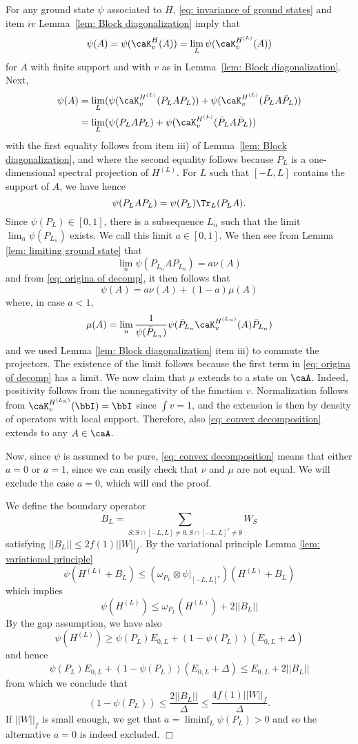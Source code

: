 For any ground state $\psi$ associated to $H$, \eqref{eq: invariance of ground states} and item $iv$ Lemma~\ref{lem: Block diagonalization} imply that
$$
\psi(A)=  \psi(\caK_v^H(A)) = \lim_L \psi(\caK_v^{H^{(L)}}(A))
$$
for $A$ with finite support and
with  $v$ as in Lemma~\ref{lem: Block diagonalization}.
Next,
\begin{align}
\psi(A) &=  \lim_L ( \psi(\caK_v^{H^{(L)}}(P_LAP_L)) +  \psi(\caK_v^{H^{(L)}}(\bar P_L A\bar P_L)) 
\\
&=  \lim_L ( \psi(P_LAP_L) +  \psi(\caK_v^{H^{(L)}}(\bar P_L A\bar P_L))  \label{eq: origina of decomp}
\end{align}
with the first equality follows from item iii) of Lemma~\ref{lem: Block diagonalization}, and
where the second equality follows because $P_L$ is a one-dimensional spectral projection of $H^{(L)}$. 
For $L$ such that $[-L,L]$ contains the support of $A$, we have hence
$$
\psi(P_LAP_L)= \psi(P_L) \Tr_L(P_LA).
$$
Since $\psi(P_L) \in [0,1]$, there is a subsequence $L_n$ such that the limit $\lim_n\psi(P_{L_n})$ exists. We call this limit $a \in [0,1]$.
We then see from Lemma \ref{lem: limiting ground state} that
$$
\lim_n \psi(P_{L_n}AP_{L_n}) = a \nu(A)
$$
and from \eqref{eq: origina of decomp}, it then follows that 
\begin{equation}\label{eq: convex decomposition}
\psi(A)= a \nu(A) +(1-a)\mu(A)
\end{equation}
where, in case $ a < 1$,  
$$
\mu(A)=\lim_n    \frac{1}{\psi(\bar{P}_{L_n})}  \psi(\bar{P}_{L_n}\caK_v^{H^{(L_n)}}(A)\bar{P}_{L_n})
$$
and we used Lemma \ref{lem: Block diagonalization} item iii) to commute the projectors. The existence of the limit follows because the first term in \eqref{eq: origina of decomp} has a limit.  
We now claim that $\mu$ extends to a state on $\caA$. Indeed, positivity follows from the nonnegativity of the function $v$. Normalization follows from $\caK_v^{H^{(L_n)}}(\bbI) = \bbI$ since $\int v = 1$, and the extension is then by density of operators with local support. Therefore, also \eqref{eq: convex decomposition} extends to any $A\in \caA$. 



Now, since $\psi$ is assumed to be pure, \eqref{eq: convex decomposition} means that either $a=0$ or $a=1$, since we can easily check that $\nu$ and $\mu$ are not equal. We will exclude the case $a=0$, which will end the proof.  

We define the boundary operator
$$
B_L= \sum_{S: S \cap [-L,L]\neq 0, S \cap [-L,L]^c \neq \emptyset}  W_S
$$
satisfying $||B_L|| \leq 2f(1) ||W||_f$. By the variational principle Lemma \ref{lem: variational principle}
$$
\psi(H^{(L)}+B_L) \leq (\omega_{P_L}\otimes\psi|_{[-L,L]^c})(H^{(L)}+B_L)
$$
which implies 
$$
\psi(H^{(L)}) \leq \omega_{P_L}(H^{(L)}) + 2||B_L||  
$$
By the gap assumption, we have 
also
$$
\psi(H^{(L)}) \geq \psi(P_L) E_{0,L}+ (1-\psi(P_L)) (E_{0,L} +\Delta)    
$$
and hence
$$
\psi(P_L) E_{0,L}+ (1-\psi(P_L)) (E_{0,L} +\Delta) \leq  E_{0,L} + 2||B_L|| 
$$
from which we conclude that
$$
(1-\psi(P_L))   \leq  \frac{2||B_L|| }{\Delta} \leq  \frac{4 f(1) ||W||_f  }{\Delta}.
$$
If $||W||_f$ is small enough, we get that $a = \liminf_L\psi(P_L)>0$ and so the alternative $a=0$ is indeed excluded. \hfill $\Box$

\cleardoublepage

